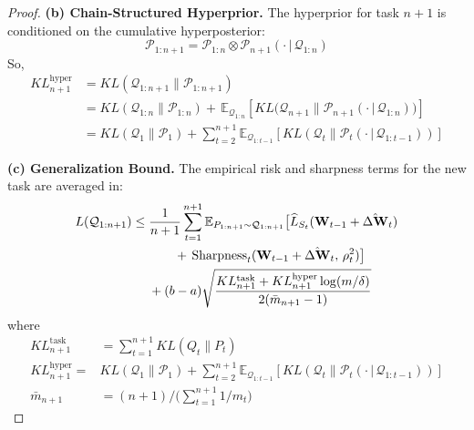\documentclass[letterpaper]{article} %
\begin{document}
\begin{proof}
\textbf{(b) Chain-Structured Hyperprior.}
    The hyperprior for task $n+1$ is conditioned on the cumulative hyperposterior:
    \begin{equation}
        \mathcal{P}_{1:n+1} = \mathcal{P}_{1:n} \otimes \mathcal{P}_{n+1}(\cdot\,|\,\mathcal{Q}_{1:n})
    \end{equation}
    So,
    \begin{equation}
        \begin{aligned}
        KL^{\text{hyper}}_{n+1}
        &=KL(\mathcal{Q}_{1:n+1} \| \mathcal{P}_{1:n+1}) \\
        &= KL(\mathcal{Q}_{1:n} \| \mathcal{P}_{1:n}) +\, \mathbb{E}_{\mathcal{Q}_{1:n}}\left[ KL\big(\mathcal{Q}_{n+1} \| \mathcal{P}_{n+1}(\cdot\,|\,\mathcal{Q}_{1:n})\big) \right] 
        \\
        &= KL(\mathcal{Q}_1 \| \mathcal{P}_1) +
         \sum_{t=2}^{n+1} \mathbb{E}_{\mathcal{Q}_{1:t-1}}\left[ KL\left(\mathcal{Q}_t \| \mathcal{P}_t(\cdot\,|\,\mathcal{Q}_{1:t-1})\right) \right]
    \end{aligned}
    \end{equation}


\textbf{(c) Generalization Bound.}
    The empirical risk and sharpness terms for the new task are averaged in:
    \begin{align}
        L(\mathcal{Q}_{1:n+1}) \leq\; & \frac{1}{n+1} \sum_{t=1}^{n+1}
        \mathbb{E}_{P_{1:n+1} \sim \mathcal{Q}_{1:n+1}}\big[
            \widehat{L}_{S_t}(\mathbf{W}_{t-1} + \hat{\Delta\mathbf{W}}_t) \notag\\
        &\qquad +\, \mathrm{Sharpness}_t(\mathbf{W}_{t-1} + \hat{\Delta\mathbf{W}}_t,\, \rho_t^2)
        \big] \notag\\
        & + (b-a)\sqrt{
            \frac{KL_{n+1}^{\text{task}} + KL_{n+1}^{\text{hyper}} \log(m/\delta)}{2(\bar{m}_{n+1} - 1)}
        }
    \end{align}
    where
    \begin{equation}
        \begin{aligned}
        KL_{n+1}^{\text{task}} &= \sum_{t=1}^{n+1} KL(Q_t\|P_t)\\
        KL_{n+1}^{\text{hyper}} = & KL(\mathcal{Q}_1\|\mathcal{P}_1)  +\sum_{t=2}^{n+1} \mathbb{E}_{\mathcal{Q}_{1:t-1}}
        \left[ KL(\mathcal{Q}_t \| \mathcal{P}_t(\cdot\,|\,\mathcal{Q}_{1:t-1})) \right] \\
        \bar{m}_{n+1} &= (n+1)/\big(\sum_{t=1}^{n+1} 1/m_t\big)
    \end{aligned}
    \end{equation}


\end{proof}
\end{document}

